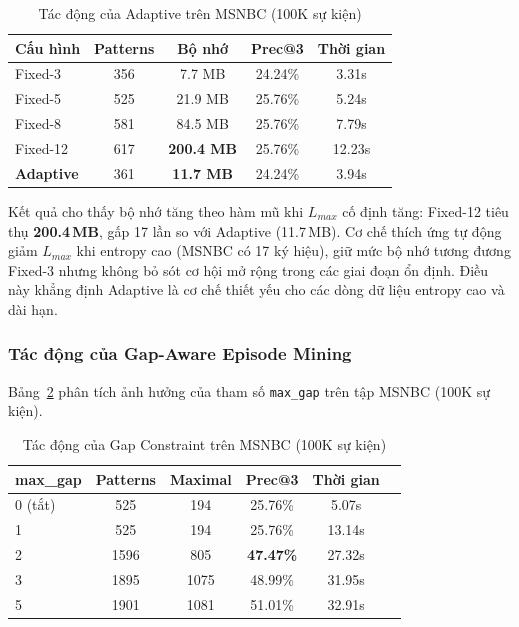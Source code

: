 \documentclass[conference]{IEEEtran}
\begin{document}
\begin{table}[htbp]
    \centering
    \caption{Tác động của Adaptive trên MSNBC (100K sự kiện)}
    \label{tab:ablation_adaptive}
    \begin{tabular}{lcccc}
        \toprule
        \textbf{Cấu hình} & \textbf{Patterns} & \textbf{Bộ nhớ} & \textbf{Prec@3} & \textbf{Thời gian} \\
        \midrule
        Fixed-3  & 356 & 7.7 MB   & 24.24\% & 3.31s \\
        Fixed-5  & 525 & 21.9 MB  & 25.76\% & 5.24s \\
        Fixed-8  & 581 & 84.5 MB  & 25.76\% & 7.79s \\
        Fixed-12 & 617 & \textbf{200.4 MB} & 25.76\% & 12.23s \\
        \midrule
        \textbf{Adaptive} & 361 & \textbf{11.7 MB} & 24.24\% & 3.94s \\
        \bottomrule
    \end{tabular}
\end{table}

Kết quả cho thấy bộ nhớ tăng theo hàm mũ khi $L_{max}$ cố định tăng: Fixed-12 tiêu thụ \textbf{200.4\,MB}, gấp 17 lần so với Adaptive (11.7\,MB). Cơ chế thích ứng tự động giảm $L_{max}$ khi entropy cao (MSNBC có 17 ký hiệu), giữ mức bộ nhớ tương đương Fixed-3 nhưng không bỏ sót cơ hội mở rộng trong các giai đoạn ổn định. Điều này khẳng định Adaptive là cơ chế thiết yếu cho các dòng dữ liệu entropy cao và dài hạn.

\subsubsection{Tác động của Gap-Aware Episode Mining}
Bảng~\ref{tab:ablation_gap} phân tích ảnh hưởng của tham số \texttt{max\_gap} trên tập MSNBC (100K sự kiện).

\begin{table}[htbp]
    \centering
    \caption{Tác động của Gap Constraint trên MSNBC (100K sự kiện)}
    \label{tab:ablation_gap}
    \begin{tabular}{lccccc}
        \toprule
        \textbf{max\_gap} & \textbf{Patterns} & \textbf{Maximal} & \textbf{Prec@3} & \textbf{Thời gian} \\
        \midrule
        0 (tắt)  & 525  & 194  & 25.76\% & 5.07s  \\
        1        & 525  & 194  & 25.76\% & 13.14s \\
        2        & 1596 & 805  & \textbf{47.47\%} & 27.32s \\
        3        & 1895 & 1075 & 48.99\% & 31.95s \\
        5        & 1901 & 1081 & 51.01\% & 32.91s \\
        \bottomrule
    \end{tabular}
\end{table}
\end{document}
